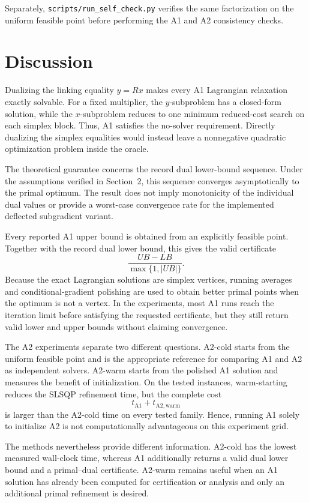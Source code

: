 \documentclass[12pt]{article}
\begin{document}
Separately, \texttt{scripts/run\_self\_check.py} verifies the same
factorization on the uniform feasible point before performing the A1
and A2 consistency checks.

\section{Discussion}

Dualizing the linking equality $y=Rx$ makes every A1 Lagrangian
relaxation exactly solvable. For a fixed multiplier, the
$y$-subproblem has a closed-form solution, while the $x$-subproblem
reduces to one minimum reduced-cost search on each simplex block.
Thus, A1 satisfies the no-solver requirement. Directly dualizing the
simplex equalities would instead leave a nonnegative quadratic
optimization problem inside the oracle.

The theoretical guarantee concerns the record dual lower-bound
sequence. Under the assumptions verified in Section~2, this sequence
converges asymptotically to the primal optimum. The result does not
imply monotonicity of the individual dual values or provide a
worst-case convergence rate for the implemented deflected
subgradient variant.

Every reported A1 upper bound is obtained from an explicitly feasible
point. Together with the record dual lower bound, this gives the valid
certificate
\[
\frac{UB-LB}{\max\{1,|UB|\}}.
\]
Because the exact Lagrangian solutions are simplex vertices, running
averages and conditional-gradient polishing are used to obtain better
primal points when the optimum is not a vertex. In the experiments,
most A1 runs reach the iteration limit before satisfying the requested
certificate, but they still return valid lower and upper bounds without
claiming convergence.

The A2 experiments separate two different questions. A2-cold starts
from the uniform feasible point and is the appropriate reference for
comparing A1 and A2 as independent solvers. A2-warm starts from the
polished A1 solution and measures the benefit of initialization. On the
tested instances, warm-starting reduces the SLSQP refinement time, but
the complete cost
\[
t_{\mathrm{A1}}+t_{\mathrm{A2,warm}}
\]
is larger than the A2-cold time on every tested family. Hence, running
A1 solely to initialize A2 is not computationally advantageous on this
experiment grid.

The methods nevertheless provide different information. A2-cold has
the lowest measured wall-clock time, whereas A1 additionally returns a
valid dual lower bound and a primal--dual certificate. A2-warm remains
useful when an A1 solution has already been computed for certification
or analysis and only an additional primal refinement is desired.
\end{document}
